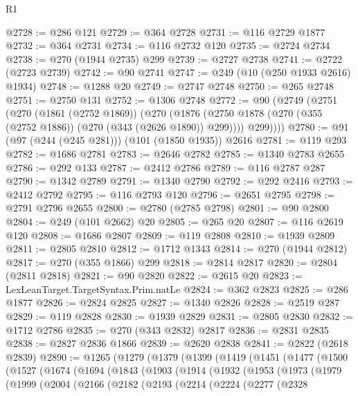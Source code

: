 \begin{lexlean}{R1}
\begin{coremodule}
@2728 := @286 @121
@2729 := @364 @2728
@2731 := @116 @2729 @1877
@2732 := @364 @2731
@2734 := @116 @2732 @120
@2735 := @2724 @2734
@2738 := @270 (@1944 @2735) @299
@2739 := @2727 @2738
@2741 := @2722 (@2723 @2739)
@2742 := @90 @2741
@2747 := @249 (@10 (@250 @1933 @2616) @1934)
@2748 := @1288 @20
@2749 := @2747 @2748
@2750 := @265 @2748
@2751 := @2750 @131
@2752 := @1306 @2748
@2772 := @90
    (@2749
      (@2751
        (@270
          (@1861 (@2752 @1869))
          (@270
            (@1876 (@2750 @1878 (@270 (@355 (@2752 @1886)) (@270 (@343 (@2626 @1890)) @299))))
            @299))))
@2780 := @91 (@97 (@244 (@245 @281))) (@101 (@1850 @1935)) @2616
@2781 := @119 @293
@2782 := @1686 @2781
@2783 := @2646 @2782
@2785 := @1340 @2783 @2655
@2786 := @292 @133
@2787 := @2412 @2786
@2789 := @116 @2787 @287
@2790 := @1342 @2789
@2791 := @1340 @2790
@2792 := @292 @2416
@2793 := @2412 @2792
@2795 := @116 @2793 @120
@2796 := @2651 @2795
@2798 := @2791 @2796 @2655
@2800 := @2780 (@2785 @2798)
@2801 := @90 @2800
@2804 := @249 (@101 @2662) @20
@2805 := @265 @20
@2807 := @116 @2619 @120
@2808 := @1686 @2807
@2809 := @119 @2808
@2810 := @1939 @2809
@2811 := @2805 @2810
@2812 := @1712 @1343
@2814 := @270 (@1944 @2812)
@2817 := @270 (@355 @1866) @299
@2818 := @2814 @2817
@2820 := @2804 (@2811 @2818)
@2821 := @90 @2820
@2822 := @2615 @20
@2823 := LexLeanTarget.TargetSyntax.Prim.natLe
@2824 := @362 @2823
@2825 := @286 @1877
@2826 := @2824 @2825
@2827 := @1340 @2826
@2828 := @2519 @287
@2829 := @119 @2828
@2830 := @1939 @2829
@2831 := @2805 @2830
@2832 := @1712 @2786
@2835 := @270 (@343 @2832) @2817
@2836 := @2831 @2835
@2838 := @2827 @2836 @1866
@2839 := @2620 @2838
@2841 := @2822 (@2618 @2839)
@2890 := @1265
    (@1279
      (@1379
        (@1399
          (@1419
            (@1451
              (@1477
                (@1500
                  (@1527
                    (@1674
                      (@1694
                        (@1843
                          (@1903
                            (@1914
                              (@1932
                                (@1953
                                  (@1973
                                    (@1979
                                      (@1999
                                        (@2004
                                          (@2166
                                            (@2182
                                              (@2193
                                                (@2214
                                                  (@2224
                                                    (@2277
                                                      (@2328

\end{coremodule}
\end{lexlean}
